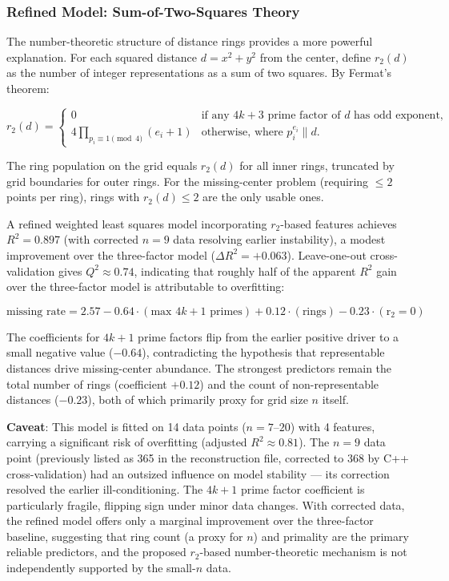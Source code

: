\documentclass[11pt,a4paper]{article}
\theoremstyle{plain}
\theoremstyle{definition}
\begin{document}
\subsubsection{Refined Model: Sum-of-Two-Squares Theory}

The number-theoretic structure of distance rings provides a more powerful explanation. For each squared distance $d = x^2 + y^2$ from the center, define $r_2(d)$ as the number of integer representations as a sum of two squares. By Fermat's theorem:

\[
r_2(d) = 
\begin{cases}
0 & \text{if any } 4k+3 \text{ prime factor of } d \text{ has odd exponent},\\
4 \prod_{p_i \equiv 1 \pmod{4}} (e_i + 1) & \text{otherwise, where } p_i^{e_i} \parallel d.
\end{cases}
\]

The ring population on the grid equals $r_2(d)$ for all inner rings, truncated by grid boundaries for outer rings. For the missing-center problem (requiring $\le 2$ points per ring), rings with $r_2(d) \le 2$ are the only usable ones.

A refined weighted least squares model incorporating $r_2$-based features achieves $R^2 = 0.897$ (with corrected $n=9$ data resolving earlier instability), a modest improvement over the three-factor model ($\Delta R^2 = +0.063$). Leave-one-out cross-validation gives $Q^2 \approx 0.74$, indicating that roughly half of the apparent $R^2$ gain over the three-factor model is attributable to overfitting:

\[
\text{missing rate} = 2.57 - 0.64\cdot(\text{max }4k+1\text{ primes}) + 0.12\cdot(\text{rings}) - 0.23\cdot(\text{r}_2=0)
\]

The coefficients for $4k+1$ prime factors flip from the earlier positive driver to a small negative value ($-0.64$), contradicting the hypothesis that representable distances drive missing-center abundance. The strongest predictors remain the total number of rings (coefficient $+0.12$) and the count of non-representable distances ($-0.23$), both of which primarily proxy for grid size $n$ itself.

\textbf{Caveat}: This model is fitted on 14 data points ($n=7$--$20$) with 4 features, carrying a significant risk of overfitting (adjusted $R^2 \approx 0.81$). The $n=9$ data point (previously listed as 365 in the reconstruction file, corrected to 368 by C++ cross-validation) had an outsized influence on model stability --- its correction resolved the earlier ill-conditioning. The $4k+1$ prime factor coefficient is particularly fragile, flipping sign under minor data changes. With corrected data, the refined model offers only a marginal improvement over the three-factor baseline, suggesting that ring count (a proxy for $n$) and primality are the primary reliable predictors, and the proposed $r_2$-based number-theoretic mechanism is not independently supported by the small-$n$ data.
\end{document}
